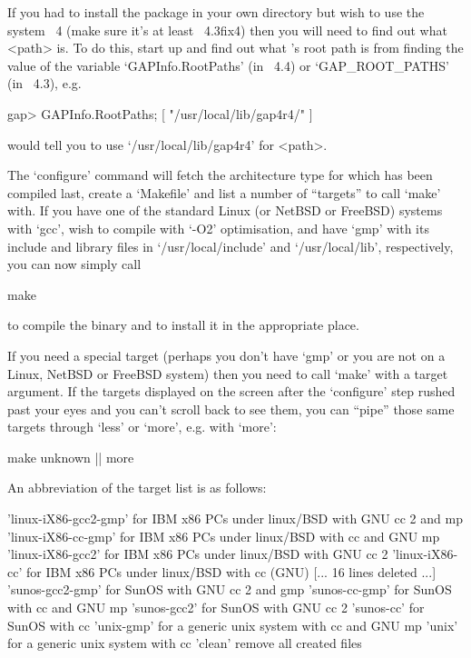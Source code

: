If you had to install the package in your own directory but wish  to  use
the system {\GAP}~4 (make sure it's at  least  {\GAP}~4.3fix4)  then  you
will need to find out what <path> is. To do this,  start  up  {\GAP}  and
find out what {\GAP}'s root  path  is  from  finding  the  value  of  the
variable `GAPInfo.RootPaths'  (in  {\GAP}~4.4)  or  `GAP_ROOT_PATHS'  (in
{\GAP}~4.3), e.g.

\begintt
gap> GAPInfo.RootPaths;
[ "/usr/local/lib/gap4r4/" ]
\endtt

would tell you to use `/usr/local/lib/gap4r4' for <path>.

The `configure' command will fetch the architecture type for which {\GAP}
has been compiled  last,  create  a  `Makefile'  and  list  a  number  of
``targets'' to call `make' with. If you have one of  the  standard  Linux
(or NetBSD or FreeBSD) systems with `gcc', wish  to  compile  with  `-O2'
optimisation, and have `gmp'  with  its  include  and  library  files  in
`/usr/local/include' and  `/usr/local/lib',  respectively,  you  can  now
simply call

\begintt
make
\endtt

to compile the binary and to install it in the appropriate place.

If you need a special target (perhaps you don't have `gmp' or you are not
on a Linux, NetBSD or FreeBSD system) then you need to call `make' with a
target argument. If  the  targets  displayed  on  the  screen  after  the
`configure' step rushed past your eyes and you can't scroll back  to  see
them, you can ``pipe'' those same targets through `less' or `more',  e.g.
with `more':

\begintt
make unknown || more
\endtt

An abbreviation of the target list is as follows:

\begintt
'linux-iX86-gcc2-gmp'      for IBM x86 PCs under linux/BSD with GNU cc 2 and mp
'linux-iX86-cc-gmp'        for IBM x86 PCs under linux/BSD with cc and GNU mp
'linux-iX86-gcc2'          for IBM x86 PCs under linux/BSD with GNU cc 2
'linux-iX86-cc'            for IBM x86 PCs under linux/BSD with cc (GNU)
[... 16 lines deleted ...]
'sunos-gcc2-gmp'           for SunOS with GNU cc 2 and gmp
'sunos-cc-gmp'             for SunOS with cc and GNU mp
'sunos-gcc2'               for SunOS with GNU cc 2
'sunos-cc'                 for SunOS with cc
'unix-gmp'                 for a generic unix system with cc and GNU mp
'unix'                     for a generic unix system with cc
'clean'                    remove all created files

